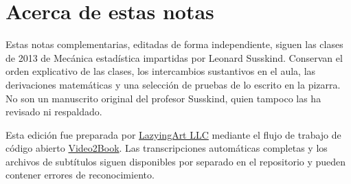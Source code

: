 \documentclass[11pt,oneside]{book}
\begin{document}
\frontmatter
\hypersetup{pageanchor=false}

\hypersetup{pageanchor=true}

\chapter{Acerca de estas notas}
Estas notas complementarias, editadas de forma independiente, siguen las clases de 2013 de Mecánica estadística impartidas por Leonard Susskind. Conservan el orden explicativo de las clases, los intercambios sustantivos en el aula, las derivaciones matemáticas y una selección de pruebas de lo escrito en la pizarra. No son un manuscrito original del profesor Susskind, quien tampoco las ha revisado ni respaldado.

Esta edición fue preparada por \href{https://lazying.art}{LazyingArt LLC} mediante el flujo de trabajo de código abierto \href{https://github.com/lachlanchen/Video2Book}{Video2Book}. Las transcripciones automáticas completas y los archivos de subtítulos siguen disponibles por separado en el repositorio y pueden contener errores de reconocimiento.
\clearpage
\tableofcontents
\mainmatter










\end{document}

